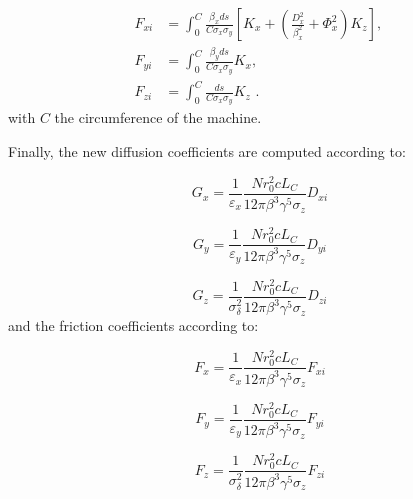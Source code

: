 \begin{equation}
    \begin{aligned}
        F_{xi} &= \int_0^C \frac{\beta_x ds}{C \sigma_x \sigma_y} \left[K_x + \left(\frac{D_x^2}{\beta_x^2} + \Phi_x^2\right) K_z \right] \text{,  } \\
        F_{yi} &= \int_0^C \frac{\beta_y ds}{C \sigma_x \sigma_y} K_x \text{,  }  \\
        F_{zi} &= \int_0^C \frac{ds}{C \sigma_x \sigma_y} K_z \text{ .}
    \end{aligned}
    \label{equation:kinetic_friction_integrals}
\end{equation}
with \(C\) the circumference of the machine.

Finally, the new diffusion coefficients are computed according to:

\begin{equation}
    \boxed{G_x = \frac{1}{\varepsilon_x} \frac{N r_0^2 c L_C}{12 \pi \beta^3 \gamma^5 \sigma_z} D_{xi}}
    \label{equation:kinetic_horizontal_diffusion_coefficient}
\end{equation}

\begin{equation}
    \boxed{G_y = \frac{1}{\varepsilon_y} \frac{N r_0^2 c L_C}{12 \pi \beta^3 \gamma^5 \sigma_z} D_{yi}}
    \label{equation:kinetic_vertical_diffusion_coefficient}
\end{equation}

\begin{equation}
    \boxed{G_z = \frac{1}{\sigma_{\delta}^2} \frac{N r_0^2 c L_C}{12 \pi \beta^3 \gamma^5 \sigma_z} D_{zi}}
    \label{equation:kinetic_longitudinal_diffusion_coefficient}
\end{equation}
and the friction coefficients according to:

\begin{equation}
    \boxed{F_x = \frac{1}{\varepsilon_x} \frac{N r_0^2 c L_C}{12 \pi \beta^3 \gamma^5 \sigma_z} F_{xi}}
    \label{equation:kinetic_horizontal_friction_coefficient}
\end{equation}

\begin{equation}
    \boxed{F_y = \frac{1}{\varepsilon_y} \frac{N r_0^2 c L_C}{12 \pi \beta^3 \gamma^5 \sigma_z} F_{yi}}
    \label{equation:kinetic_vertical_friction_coefficient}
\end{equation}

\begin{equation}
    \boxed{F_z = \frac{1}{\sigma_{\delta}^2} \frac{N r_0^2 c L_C}{12 \pi \beta^3 \gamma^5 \sigma_z} F_{zi}}
    \label{equation:kinetic_longitudinal_friction_coefficient}
\end{equation}

